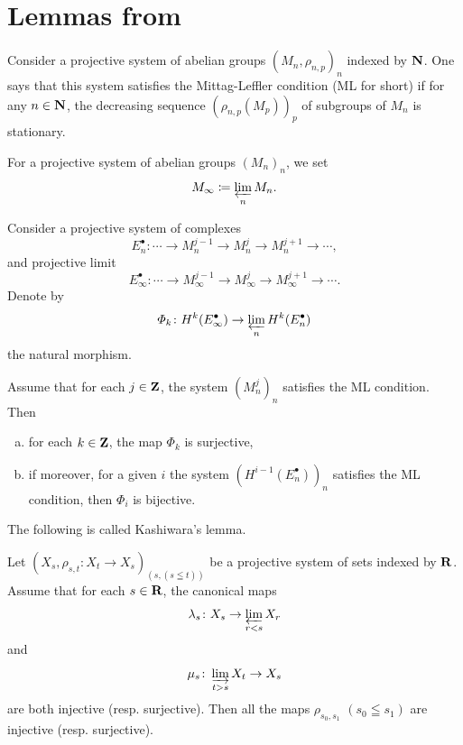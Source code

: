 \section{Lemmas from {\cite{KS90}}}

Consider a projective system of abelian groups \(
  \left(M_n,\rho_{n,p}\right)_n
\) indexed by \(\nn\). 
One says that this system satisfies 
the Mittag-Leffler condition (ML for short) 
if for any \(n\in\nn\), the decreasing sequence \(
  (\rho_{n,p}(M_p))_p
\) of subgroups of \(M_n\) is stationary.

For a projective system of abelian groups \((M_{n})_n\), 
we set \[
  M_{\infty}\coloneqq \prolim[n]M_n.
\]

Consider a projective system of complexes
\begin{equation}
  E_n^{\bullet}\colon 
  \cdots\to M_{n}^{j-1}\to M_{n}^{j}\to M_{n}^{j+1}\to\cdots,
\end{equation}
and projective limit
\begin{equation}
  E_{\infty}^{\bullet}\colon 
  \cdots
  \to M_{\infty}^{j-1}
  \to M_{\infty}^{j}
  \to M_{\infty}^{j+1}
  \to\cdots.
\end{equation}
Denote by 
\begin{equation}
  \varPhi_{k}\colon H^{k}(E_{\infty}^{\bullet})\to \prolim[n]H^{k}(E_{n}^{\bullet})
\end{equation}
the natural morphism.

\begin{Proposition+}[{\cite[Proposition 1.12.4]{KS90}}]\label{prop:ks1.12.4}
  Assume that for each \(j\in\zz\), 
  the system \(\left(M_{n}^{j}\right)_{n}\) satisfies 
  the ML condition. 
  Then
  \begin{enumerate}[(a)]
    \item for each \(k\in \zz\), the map \(\varPhi_k\) is surjective,
    \item if moreover, for a given \(i\) the system \(\left(H^{i-1}(E_{n}^{\bullet})\right)_{n}\) satisfies the ML condition, then \(\varPhi_i\) is bijective.
  \end{enumerate} 
\end{Proposition+}

The following is called Kashiwara's lemma.

\begin{Proposition+}[{\cite[Proposition 1.12.6]{KS90}}]\label{prop:ks1.12.6}
  Let \(\left(X_s,\rho_{s,t}\colon X_t\to X_s\right)_{(s,(s\leqq t))}\) be 
  a projective system of sets indexed by \(\rr\). 
  Assume that for each \(s\in\rr\), the canonical maps\[
    \lambda_s\colon X_s\to\prolim[r<s]X_r
  \] and \[
    \mu_s\colon \indlim[t>s]X_t\to X_s
  \] are both injective (resp. surjective). 
  Then all the maps \(\rho_{s_{0},s_{1}}\) \((s_0\leqq s_1)\) are 
  injective (resp. surjective).
\end{Proposition+}

